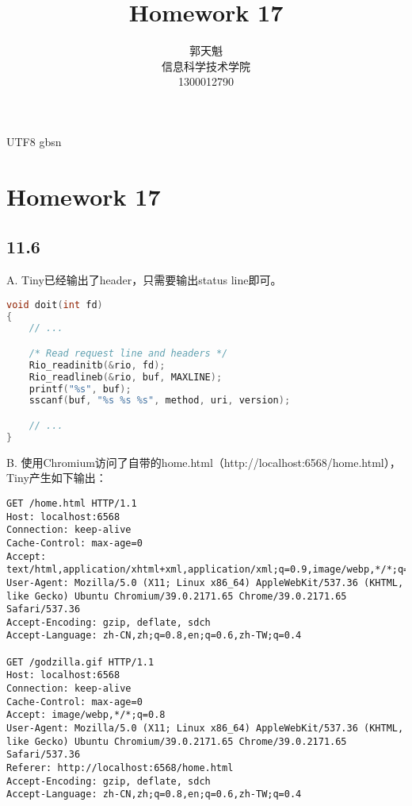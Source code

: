 \documentclass {article}
\begin{document}
  \begin {CJK*} {UTF8} {gbsn}
	\title {\textbf {\Huge Homework 17}}
		\author {郭天魁 \\ 信息科学技术学院 \\ 1300012790}

		\maketitle
		
		\section{Homework 17}
			\subsection{11.6}
				A. Tiny已经输出了header，只需要输出status line即可。
				
				\begin{lstlisting}[language=C]
void doit(int fd) 
{
	// ...

	/* Read request line and headers */
	Rio_readinitb(&rio, fd);
	Rio_readlineb(&rio, buf, MAXLINE);
	printf("%s", buf);
	sscanf(buf, "%s %s %s", method, uri, version);

	// ...
}
				\end{lstlisting}

				B. 使用Chromium访问了自带的home.html（http://localhost:6568/home.html），Tiny产生如下输出：

				\begin{lstlisting}[numbers=none]
GET /home.html HTTP/1.1
Host: localhost:6568
Connection: keep-alive
Cache-Control: max-age=0
Accept: text/html,application/xhtml+xml,application/xml;q=0.9,image/webp,*/*;q=0.8
User-Agent: Mozilla/5.0 (X11; Linux x86_64) AppleWebKit/537.36 (KHTML, like Gecko) Ubuntu Chromium/39.0.2171.65 Chrome/39.0.2171.65 Safari/537.36
Accept-Encoding: gzip, deflate, sdch
Accept-Language: zh-CN,zh;q=0.8,en;q=0.6,zh-TW;q=0.4

GET /godzilla.gif HTTP/1.1
Host: localhost:6568
Connection: keep-alive
Cache-Control: max-age=0
Accept: image/webp,*/*;q=0.8
User-Agent: Mozilla/5.0 (X11; Linux x86_64) AppleWebKit/537.36 (KHTML, like Gecko) Ubuntu Chromium/39.0.2171.65 Chrome/39.0.2171.65 Safari/537.36
Referer: http://localhost:6568/home.html
Accept-Encoding: gzip, deflate, sdch
Accept-Language: zh-CN,zh;q=0.8,en;q=0.6,zh-TW;q=0.4

				\end{lstlisting}


\end{CJK*}
\end{document}

